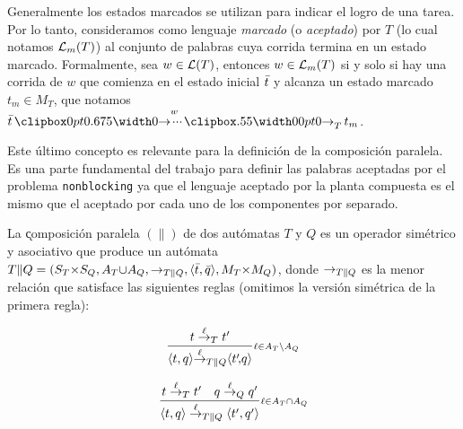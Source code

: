 Generalmente los estados marcados se utilizan para indicar el logro de una tarea. Por lo tanto, consideramos como lenguaje \textit{marcado} (o \textit{aceptado}) por $T$ (lo cual notamos $\mathcal{L}_m(T)$) al conjunto de palabras cuya corrida termina en un estado marcado. Formalmente, sea $w \in \mathcal{L}(T)$, entonces $w \in \mathcal{L}_m(T)$ si y solo si hay una corrida de $w$ que comienza en el estado inicial $\bar{t}$ y alcanza un estado marcado $t_m \in M_T$, que notamos $\init{t} \runw{w}{T} t_m$.

Este último concepto es relevante para la definición de la composición paralela. Es una parte fundamental del trabajo para definir las palabras aceptadas por el problema \texttt{nonblocking} ya que el lenguaje aceptado por la planta compuesta es el mismo que el aceptado por cada uno de los componentes por separado.

\begin{definition}  \label{def:parcomp}
	La \k{composición paralela} $(\|)$ de dos autómatas $T$ y $Q$ es un operador simétrico y asociativo que produce un autómata $T \| Q = (S_T {\times} S_Q, A_T {\cup} 
	A_Q, \rightarrow_{T\|Q}, \langle\bar{t},\bar{q}\rangle, M_T {\times} M_Q)$, donde $\rightarrow_{T\|Q}$ es la menor relación que satisface las siguientes reglas (omitimos la versión simétrica de la primera regla):
	
	\begin{normalsize}
		\centering
		\vspace{-18pt}
		\hspace{-50pt}
		\begin{minipage}{0.30\linewidth}
			\[ 
			\frac{t \overset{\ell}{\rightarrow}_{T} t'}{\langle t,q\rangle {\overset{\ell}{\rightarrow}_{T\|Q}} \langle t'\!,\!q\rangle }{{\scriptstyle \ell \in A_{T} {\setminus} A_{Q}}} 
			\]
		\end{minipage} 
		\hspace{40pt}
		\begin{minipage}{0.30\linewidth}
			\[ 
			\frac{t \overset{\ell}{\rightarrow}_{T} t' \quad q \overset{\ell}{\rightarrow}_{Q} q'}{\langle t,q\rangle \overset{\ell}{\rightarrow}_{T\|Q} \langle t',q'\rangle}{{\scriptstyle \ell \in A_{T} {\cap} A_{Q}}}
			\]
		\end{minipage} \\[15pt]
	\end{normalsize}
\end{definition}

